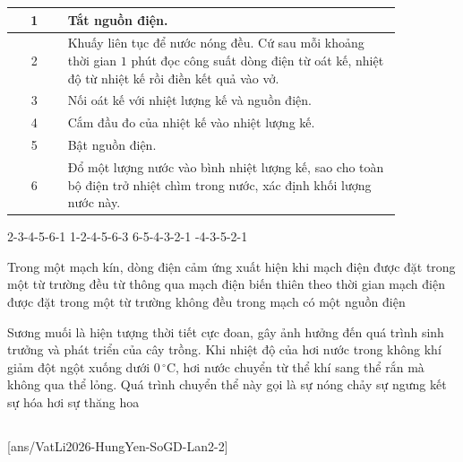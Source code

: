 \begin{ex}
\begin{center}
			\begin{tabular}{|c|p{0.86\linewidth}|}
				\hline
				1 & Tắt nguồn điện.\\ \hline
				2 & Khuấy liên tục để nước nóng đều. Cứ sau mỗi khoảng thời gian $1$ phút đọc công suất dòng điện từ oát kế, nhiệt độ từ nhiệt kế rồi điền kết quả vào vở.\\ \hline
				3 & Nối oát kế với nhiệt lượng kế và nguồn điện.\\ \hline
				4 & Cắm đầu đo của nhiệt kế vào nhiệt lượng kế.\\ \hline
				5 & Bật nguồn điện.\\ \hline
				6 & Đổ một lượng nước vào bình nhiệt lượng kế, sao cho toàn bộ điện trở nhiệt chìm trong nước, xác định khối lượng nước này.\\ \hline
			\end{tabular}
		\end{center}
		\choice
		{2-3-4-5-6-1}
		{1-2-4-5-6-3}
		{6-5-4-3-2-1}
		{-4-3-5-2-1}
	\end{ex}

	\begin{ex}%
		Trong một mạch kín, dòng điện cảm ứng xuất hiện khi
		\choice
		{mạch điện được đặt trong một từ trường đều}
		{\True từ thông qua mạch điện biến thiên theo thời gian}
		{mạch điện được đặt trong một từ trường không đều}
		{trong mạch có một nguồn điện}
	\end{ex}

	\begin{ex}%
		Sương muối là hiện tượng thời tiết cực đoan, gây ảnh hưởng đến quá trình sinh trưởng và phát triển của cây trồng. Khi nhiệt độ của hơi nước trong không khí giảm đột ngột xuống dưới $0\,^\circ\text{C}$, hơi nước chuyển từ thể khí sang thể rắn mà không qua thể lỏng. Quá trình chuyển thể này gọi là
		\choice
		{sự nóng chảy}
		{\True sự ngưng kết}
		{sự hóa hơi}
		{sự thăng hoa}
	\end{ex}

	\subsection*{}
	\setcounter{ex}{0}
	[ans/VatLi2026-HungYen-SoGD-Lan2-2]

